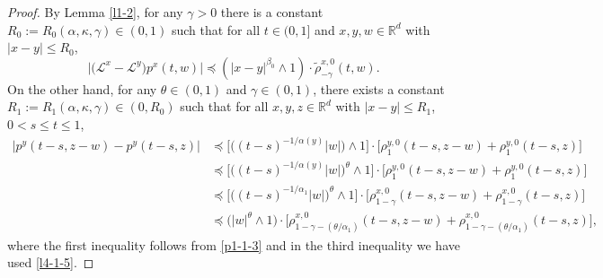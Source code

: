 \documentclass[a4paper,11pt]{amsart}
\renewcommand{\le}{\leqslant}
\newcommand{\R}{\mathds R}
\newcommand{\B}{\beta}
\newcommand{\T}{\theta}
\newcommand{\p}{\preceq}
\newcommand{\K}{\kappa}
\newcommand{\A}{\alpha}
\newcommand{\G}{\gamma}
\def\LL{{\mathcal L}}
\theoremstyle{definition}
\begin{document}
\begin{proof}
By Lemma \ref{l1-2}, for any $\G>0$ there is a constant $R_0:=R_0(\A,\K,\G)\in(0,1)$ such that for all $t\in(0,1]$ and $x,y,w\in \R^d$ with $|x-y|\le R_0$,
\begin{equation}\label{l4-1-4}
\big|\big( \LL^x- \LL^y\big)p^x(t,w)\big|\p (|x-y|^{\B_0}\wedge 1)\cdot\tilde \rho^{x,0}_{-\G}(t,w).
\end{equation}
On the other hand, for any $\T \in (0,1)$ and $\G\in (0,1)$, there exists a
constant $R_1:=R_1(\A,\K,\G)\in(0,R_0)$ such that for all
 $x,y,z\in\R^d$ with $|x-y|\le R_1$, $0<s\le t\le1$,
\begin{equation}\label{l4-1-6}
\begin{split}
 \big|p^y(t-s,z-w)-p^y(t-s,z)\big|
&\p \big[\big((t-s)^{-{1/\A(y)}}|w|\big)\wedge 1\big]\cdot
\big[\rho^{y,0}_1(t-s,z-w)+\rho^{y,0}_1(t-s,z)\big]\\
&\p \big[\big((t-s)^{-{1/\A(y)}}|w|\big)^{\T}\wedge 1\big]\cdot
\big[\rho^{y,0}_1(t-s,z-w)+\rho^{y,0}_1(t-s,z)\big]\\
&\p \big[\big((t-s)^{-{1}/{\A_1}}|w|\big)^{\T}\wedge 1\big]\cdot
\big[\rho^{x,0}_{1-\G}(t-s,z-w)+\rho^{x,0}_{1-\G}(t-s,z)\big]\\
&\p \big(|w|^{\T}\wedge 1\big)\cdot
\big[\rho^{x,0}_{1-\G-({\theta}/{\A_1})}(t-s,z-w)+\rho^{x,0}_{1-\G-({\theta}/{\A_1})}(t-s,z)\big],
\end{split}
\end{equation}
where the first inequality follows from \eqref{p1-1-3} and in the third inequality we have used \eqref{l4-1-5}.


\end{proof}
\end{document}
